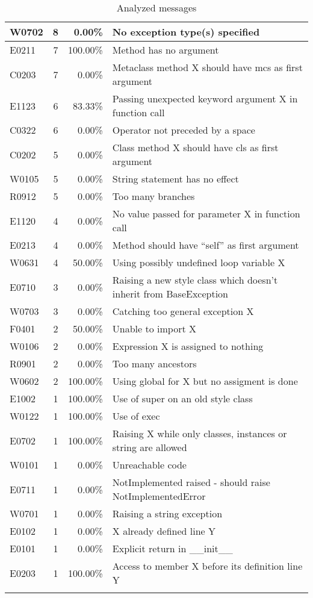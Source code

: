 \documentclass[11pt, a4paper]{article}
\begin{document}
\begin{longtable}{|l|c|r|m{9cm}|}
\hline
W0702 & 8 & 0.00\% & No exception type(s) specified \\
\hline
E0211 & 7 & 100.00\% & Method has no argument \\
\hline
C0203 & 7 & 0.00\% & Metaclass method X should have mcs as first argument \\
\hline
E1123 & 6 & 83.33\% & Passing unexpected keyword argument X in function call \\
\hline
C0322 & 6 & 0.00\% & Operator not preceded by a space \\
\hline
C0202 & 5 & 0.00\% & Class method X should have cls as first argument \\
\hline
W0105 & 5 & 0.00\% & String statement has no effect \\
\hline
R0912 & 5 & 0.00\% & Too many branches \\
\hline
E1120 & 4 & 0.00\% & No value passed for parameter X in function call \\
\hline
E0213 & 4 & 0.00\% & Method should have \enquote{self} as first argument \\
\hline
W0631 & 4 & 50.00\% & Using possibly undefined loop variable X \\
\hline
E0710 & 3 & 0.00\% & Raising a new style class which doesn't inherit from BaseException \\
\hline
W0703 & 3 & 0.00\% & Catching too general exception X \\
\hline
F0401 & 2 & 50.00\% & Unable to import X \\
\hline
W0106 & 2 & 0.00\% & Expression X is assigned to nothing \\
\hline
R0901 & 2 & 0.00\% & Too many ancestors \\
\hline
W0602 & 2 & 100.00\% & Using global for X but no assigment is done \\
\hline
E1002 & 1 & 100.00\% & Use of super on an old style class \\
\hline
W0122 & 1 & 100.00\% & Use of exec \\
\hline
E0702 & 1 & 100.00\% & Raising X while only classes, instances or string are allowed \\
\hline
W0101 & 1 & 0.00\% & Unreachable code \\
\hline
E0711 & 1 & 0.00\% & NotImplemented raised - should raise NotImplementedError \\
\hline
W0701 & 1 & 0.00\% & Raising a string exception \\
\hline
E0102 & 1 & 0.00\% & X already defined line Y \\
\hline
E0101 & 1 & 0.00\% & Explicit return in \_\_init\_\_ \\
\hline
E0203 & 1 & 100.00\% & Access to member X before its definition line Y \\
\hline
\caption{\label{messages} Analyzed messages}
\end{longtable}
\end{document}
